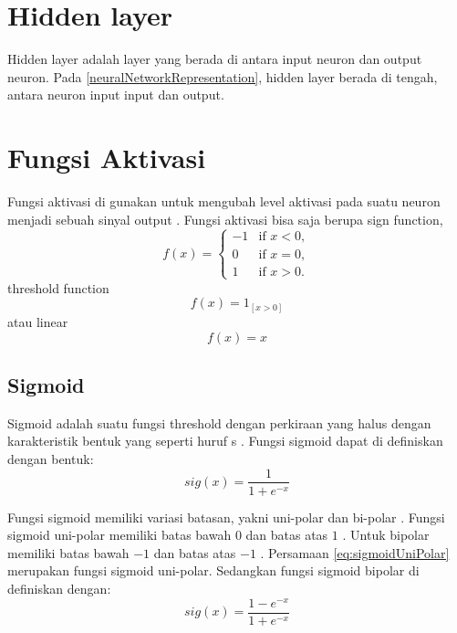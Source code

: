 \section{Hidden layer}
    Hidden layer adalah layer yang berada di antara input neuron dan output neuron\cite{ShaiUnderstandingMachineLearning}. Pada \ref{neuralNetworkRepresentation}, hidden layer berada di tengah, antara neuron input input dan output. 
\section{Fungsi Aktivasi}
    Fungsi aktivasi di gunakan untuk mengubah level aktivasi pada suatu neuron menjadi sebuah sinyal output \cite{KarlicOlgacPerformanceAnalysis}. Fungsi aktivasi bisa saja berupa sign function,
    \begin{equation}
        f(x) =
        \begin{cases}
            -1 & \text{if } x < 0, \\
            0 & \text{if } x = 0, \\
            1 & \text{if } x > 0.
        \end{cases}
    \end{equation}
    threshold function
    \begin{equation}
        f(x) = 1_{[x>0]}
    \end{equation}
    \begin{equation}
    \end{equation}
    atau linear
    \begin{equation}
        f(x) = x
    \end{equation}
\subsection{Sigmoid}
    Sigmoid adalah suatu fungsi threshold dengan perkiraan yang halus dengan karakteristik bentuk yang seperti huruf s \cite{ShaiUnderstandingMachineLearning}. Fungsi sigmoid dapat di definiskan dengan bentuk:
    \begin{equation}
        sig(x) = \frac{1}{1+e^{-x}}
        \label{eq:sigmoidUniPolar}
    \end{equation}

    Fungsi sigmoid memiliki variasi batasan, yakni uni-polar dan bi-polar \cite{KarlicOlgacPerformanceAnalysis}. Fungsi sigmoid uni-polar memiliki batas bawah $0$ dan batas atas $1$ \cite{KarlicOlgacPerformanceAnalysis}. Untuk bipolar memiliki batas bawah $-1$ dan batas atas $-1$ \cite{KarlicOlgacPerformanceAnalysis}.
    Persamaan \ref{eq:sigmoidUniPolar} merupakan fungsi sigmoid uni-polar. Sedangkan fungsi sigmoid bipolar di definiskan dengan:
    \begin{equation}
        sig(x) = \frac{1-e^{-x}}{1+e^{-x}}
    \end{equation}
